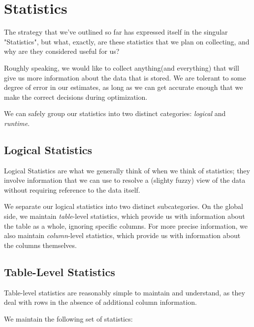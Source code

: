 \section{Statistics}
The strategy that we've outlined so far has expressed itself in the singular "Statistics", but what, exactly, are these statistics that we plan on collecting, and why are they considered useful for us?

Roughly speaking, we would like to collect anything(and everything) that will give us more information about the data that is stored. We are tolerant to some degree of error in our estimates, as long as we can get accurate enough that we make the correct decisions during optimization. 

We can safely group our statistics into two distinct categories: \emph{logical} and \emph{runtime}.  

\subsection{Logical Statistics}
Logical Statistics are what we generally think of when we think of statistics; they involve information that we can use to resolve a (slighty fuzzy) view of the data without requiring reference to the data itself.

We separate our logical statistics into two distinct subcategories. On the global side, we maintain \emph{table}-level statistics, which provide us with information about the table as a whole, ignoring specific columns. For more precise information, we also maintain \emph{column}-level statistics, which provide us with information about the columns themselves.

\subsection{Table-Level Statistics}
Table-level statistics are reasonably simple to maintain and understand, as they deal with rows in the absence of additional column information. 

We maintain the following set of statistics:

